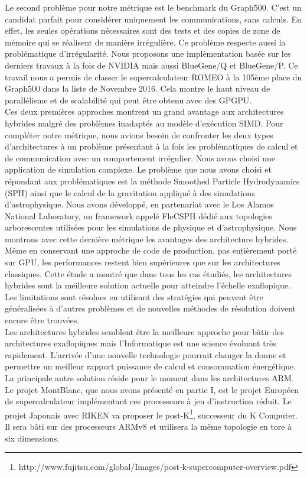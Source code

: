 \documentclass[12pt,a4paper]{report}
\begin{document}
Le second problème pour notre métrique est le benchmark du Graph500. 
C'est un candidat parfait pour considérer uniquement les communications, sans calculs. 
En effet, les seules opérations nécessaires sont des tests et des copies de zone de mémoire qui se réalisent de manière irrégulière. 
Ce problème respecte aussi la problématique d'irrégularité. 
Nous proposons une implémentation basée sur les derniers travaux à la fois de NVIDIA mais aussi BlueGene/Q et BlueGene/P. 
Ce travail nous a permis de classer le supercalculateur ROMEO à la 105ème place du Graph500 dans la liste de Novembre 2016. 
Cela montre le haut niveau de parallélisme et de scalabilité qui peut être obtenu avec des GPGPU.\\

Ces deux premières approches montrent un grand avantage aux architectures hybrides malgré des problèmes inadaptés au modèle d'exécution SIMD. 
Pour compléter notre métrique, nous avions besoin de confronter les deux types d'architectures à un problème présentant à la fois les problématiques de calcul et de communication avec un comportement irrégulier. 
Nous avons choisi une application de simulation complexe.
Le problème que nous avons choisi et répondant aux problématiques est la méthode Smoothed Particle Hydrodynamics (SPH) ainsi que le calcul de la gravitation appliqué à des simulations d'astrophysique.  
Nous avons développé, en partenariat avec le Los Alamos National Laboratory, un framework appelé FleCSPH dédié aux topologies arborescentes utilisées pour les simulations de physique et d'astrophysique. 
Nous montrons avec cette dernière métrique les avantages des architecture hybrides. 
Même en conservant une approche de code de production, pas entièrement porté sur GPU, les performances restent bien supérieures que sur les architectures classiques. 
Cette étude a montré que dans tous les cas étudiés, les architectures hybrides sont la meilleure solution actuelle pour atteindre l'échelle exaflopique.  
Les limitations sont résolues en utilisant des stratégies qui peuvent être généralisées à d'autres problèmes et de nouvelles méthodes de résolution doivent encore être trouvées.\\

 Les architectures hybrides semblent être la meilleure approche pour bâtir des architectures exaflopiques mais l'Informatique est une science évoluant très rapidement. 
L'arrivée d'une nouvelle technologie pourrait changer la donne et permettre un meilleur rapport puissance de calcul et consommation énergétique. 
La principale autre solution réside pour le moment dans les architectures ARM.
Le projet MontBlanc, que nous avons présenté en partie I, est le projet Européen de supercalculateur implémentant ces processeurs à jeu d'instruction réduit.  
Le projet Japonais avec RIKEN va proposer le post-K\footnote{http://www.fujitsu.com/global/Images/post-k-supercomputer-overview.pdf}, successeur du K Computer.
Il sera bâti sur des processeurs ARMv8 et utilisera la même topologie en tore à six dimensions. 
\end{document}
